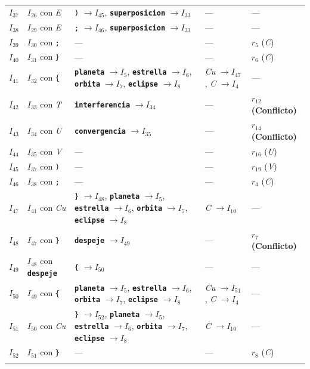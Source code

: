 \documentclass[12pt, letterpaper]{article}
\begin{document}
{\begin{longtable}{c l p{5.0cm} p{2.6cm} p{3.6cm}}
\addlinespace[2pt]
$I_{37}$ & $I_{26}$ con \textit{E} & \texttt{)} $\to I_{45}$, \textbf{\texttt{superposicion}} $\to I_{33}$ & --- & --- \\
\addlinespace[2pt]
$I_{38}$ & $I_{29}$ con \textit{E} & \texttt{;} $\to I_{46}$, \textbf{\texttt{superposicion}} $\to I_{33}$ & --- & --- \\
\addlinespace[2pt]
$I_{39}$ & $I_{30}$ con \texttt{;} & --- & --- & $r_{5}$ (\textit{C}) \\
\addlinespace[2pt]
$I_{40}$ & $I_{31}$ con \texttt{\}} & --- & --- & $r_{6}$ (\textit{C}) \\
\addlinespace[2pt]
$I_{41}$ & $I_{32}$ con \texttt{\{} & \textbf{\texttt{planeta}} $\to I_{5}$, \textbf{\texttt{estrella}} $\to I_{6}$, \textbf{\texttt{orbita}} $\to I_{7}$, \textbf{\texttt{eclipse}} $\to I_{8}$ & \textit{Cu} $\to I_{47}$, \textit{C} $\to I_{4}$ & --- \\
\addlinespace[2pt]
$I_{42}$ & $I_{33}$ con \textit{T} & \textbf{\texttt{interferencia}} $\to I_{34}$ & --- & \textbf{\color{accent}$r_{12}$ (Conflicto)} \\
\addlinespace[2pt]
$I_{43}$ & $I_{34}$ con \textit{U} & \textbf{\texttt{convergencia}} $\to I_{35}$ & --- & \textbf{\color{accent}$r_{14}$ (Conflicto)} \\
\addlinespace[2pt]
$I_{44}$ & $I_{35}$ con \textit{V} & --- & --- & $r_{16}$ (\textit{U}) \\
\addlinespace[2pt]
$I_{45}$ & $I_{37}$ con \texttt{)} & --- & --- & $r_{19}$ (\textit{V}) \\
\addlinespace[2pt]
$I_{46}$ & $I_{38}$ con \texttt{;} & --- & --- & $r_{4}$ (\textit{C}) \\
\addlinespace[2pt]
$I_{47}$ & $I_{41}$ con \textit{Cu} & \texttt{\}} $\to I_{48}$, \textbf{\texttt{planeta}} $\to I_{5}$, \textbf{\texttt{estrella}} $\to I_{6}$, \textbf{\texttt{orbita}} $\to I_{7}$, \textbf{\texttt{eclipse}} $\to I_{8}$ & \textit{C} $\to I_{10}$ & --- \\
\addlinespace[2pt]
$I_{48}$ & $I_{47}$ con \texttt{\}} & \textbf{\texttt{despeje}} $\to I_{49}$ & --- & \textbf{\color{accent}$r_{7}$ (Conflicto)} \\
\addlinespace[2pt]
$I_{49}$ & $I_{48}$ con \textbf{\texttt{despeje}} & \texttt{\{} $\to I_{50}$ & --- & --- \\
\addlinespace[2pt]
$I_{50}$ & $I_{49}$ con \texttt{\{} & \textbf{\texttt{planeta}} $\to I_{5}$, \textbf{\texttt{estrella}} $\to I_{6}$, \textbf{\texttt{orbita}} $\to I_{7}$, \textbf{\texttt{eclipse}} $\to I_{8}$ & \textit{Cu} $\to I_{51}$, \textit{C} $\to I_{4}$ & --- \\
\addlinespace[2pt]
$I_{51}$ & $I_{50}$ con \textit{Cu} & \texttt{\}} $\to I_{52}$, \textbf{\texttt{planeta}} $\to I_{5}$, \textbf{\texttt{estrella}} $\to I_{6}$, \textbf{\texttt{orbita}} $\to I_{7}$, \textbf{\texttt{eclipse}} $\to I_{8}$ & \textit{C} $\to I_{10}$ & --- \\
\addlinespace[2pt]
$I_{52}$ & $I_{51}$ con \texttt{\}} & --- & --- & $r_{8}$ (\textit{C}) \\
\addlinespace[2pt]
\end{longtable}
}
\end{document}
